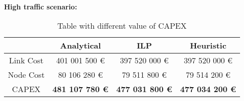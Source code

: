 \vspace{11pt}
\textbf{High traffic scenario:}\\

\begin{table}[h!]
\centering
\begin{tabular}{| c | c | c | c |}
 \hline
   & Analytical & ILP & Heuristic \\
 \hline\hline
 Link Cost & 401 001 500 \euro & 397 520 000 \euro & 397 520 000 \euro \\
 Node Cost & 80 106 280 \euro & 79 511 800 \euro & 79 514 200 \euro \\
 CAPEX & \textbf{481 107 780 \euro} & \textbf{477 031 800 \euro} & \textbf{477 034 200 \euro} \\
 \hline
\end{tabular}
\caption{Table with different value of CAPEX }
\label{table_comparative_opaque_protec_ref_3}
\end{table}

